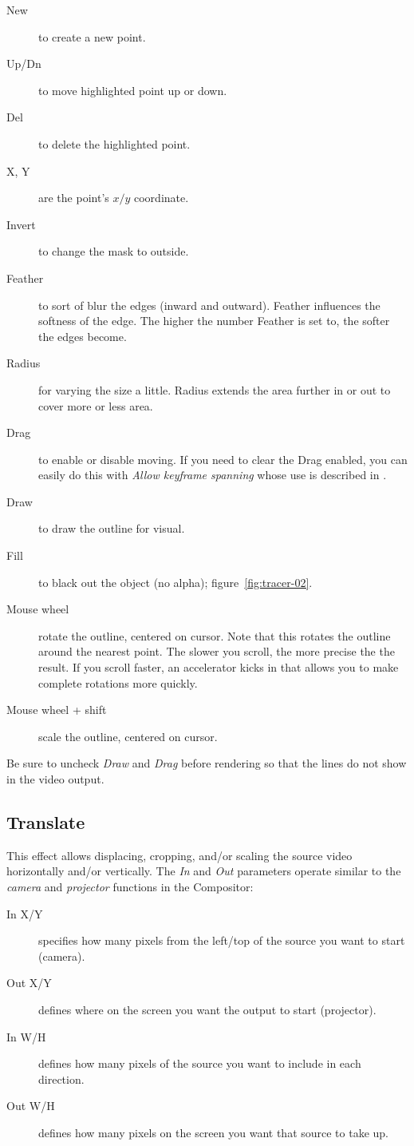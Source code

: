 \begin{description}
	\item[New] to create a new point.
	\item[Up/Dn] to move highlighted point up or down.
	\item[Del] to delete the highlighted point.
	\item[X, Y] are the point’s $x/y$ coordinate.
	\item[Invert] to change the mask to outside.
	\item[Feather] to sort of blur the edges (inward and outward). Feather influences the softness of the edge. The higher the number Feather is set to, the softer the edges become.
	\item[Radius] for varying the size a little. Radius extends the area further in or out to cover more or less area.
	\item[Drag] to enable or disable moving.  If you need to clear the Drag enabled, you can easily do this with \textit{Allow keyframe spanning} whose use is described in .
	\item[Draw] to draw the outline for visual.
	\item[Fill] to black out the object (no alpha); figure~\ref{fig:tracer-02}.
	\item[Mouse wheel] rotate the outline, centered on cursor. Note that this rotates the outline around the nearest point. The slower you scroll, the more precise the the result. If you scroll faster, an accelerator kicks in that allows you to make complete rotations more quickly.
	\item[Mouse wheel + shift] scale the outline, centered on cursor.
\end{description}

Be sure to uncheck \textit{Draw} and \textit{Drag} before rendering so that the lines do not show in the video output.



\subsection{Translate}%
\label{sub:translate}

This effect allows displacing, cropping, and/or scaling the source video horizontally and/or vertically. The \textit{In} and \textit{Out} parameters operate similar to the \textit{camera} and \textit{projector} functions in the Compositor:

\begin{description}
    \item[In X/Y] specifies how many pixels from the left/top of the source you want to start (camera).
    \item[Out X/Y] defines where on the screen you want the output to start (projector).
    \item[In W/H] defines how many pixels of the source you want to include in each direction.
    \item[Out W/H] defines how many pixels on the screen you want that source to take up.
\end{description}

